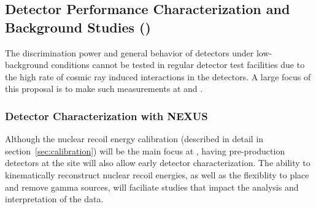 \subsection{Detector Performance Characterization and Background Studies ()}


The  discrimination power and general behavior of \scs detectors under low-background conditions cannot be tested in regular detector test facilities due to the high rate of cosmic ray induced interactions in the detectors. A large focus of this proposal is to make such measurements at \nexus and \cute. 


\subsubsection{Detector Characterization with NEXUS}

Although the nuclear recoil energy calibration (described in detail in section~\ref{sec:calibration}) will be the main focus at \nexus, having pre-production detectors at the site will also allow early detector characterization. The  ability to kinematically reconstruct nuclear recoil energies, as well as the flexiblity to place and remove gamma sources, will faciliate studies that impact the analysis and interpretation of the \scs data. 

